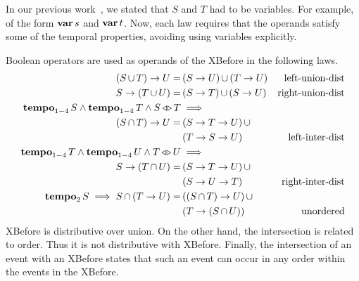 \documentclass[12pt,openright,twoside,a4paper,oldfontcommands,english,brazil,final]{abntex2}
\theoremstyle{theo}
\def\varop{\ensuremath\operatorname{\mathbf{var}}}
\newcommand{\var}[1]{\ensuremath\varop #1}
\def\xbeforeop{\ensuremath\rightarrow}
\newcommand{\xbefore}[2]{\ensuremath #1 \xbeforeop #2 }
\def\tempoop{\ensuremath\operatorname{\mathbf{tempo}}}
\newcommand{\tempo}[2][1-4]{\ensuremath\tempoop_{#1} #2}
\def\independenteventsop{\ensuremath\operatorname{\triangleleft\triangleright}}
\newcommand{\independentevents}[2]{\ensuremath #1 \independenteventsop #2}
\newcommand{\parsin}[1]{\ensuremath\left( #1 \right)}
\def\union{\ensuremath\operatorname{\cup}}
\def\inter{\ensuremath\operatorname{\cap}}
\begin{document}
In our previous work~\cite{DM2015}, we stated that $S$ and $T$ had to be variables.
For example, of the form $\var{s}$ and $\var{t}$.
Now, each law requires that the operands satisfy some of the temporal properties, avoiding using variables explicitly.

Boolean operators are used as operands of the \ac{XBefore} in the following laws.
%
\begin{subequations}
\begin{align}
\xbefore{\left(S \union T\right)}{U} =&
  \parsin{\xbefore{S}{U}} \union \parsin{\xbefore{T}{U}} &
  \text{left-union-dist}
  \label{thm:xbefore-sup-1}\\
%
\xbefore{S}{\left(T \union U\right)} =&
  \parsin{\xbefore{S}{T}} \union \parsin{\xbefore{S}{U}} &
  \text{right-union-dist}
  \label{thm:xbefore-sup-2}\\
%
\tempo{S} \land \tempo{T} \land \independentevents{S}{T} & \implies\nonumber \\
  \xbefore{\left(S \inter T\right)}{U} =&
  \parsin{\xbefore{\xbefore{S}{T}}{U}} \union \nonumber\\
  &\parsin{\xbefore{\xbefore{T}{S}}{U}} &
  \text{left-inter-dist}
  \label{thm:xbefore-inf-1}\\
%
\tempo{T} \land \tempo{U} \land \independentevents{T}{U} & \implies \nonumber\\
  \xbefore{S}{\left(T \inter U\right)} =&
  \parsin{\xbefore{S}{\xbefore{T}{U}}} \union \nonumber\\
  &\parsin{\xbefore{S}{\xbefore{U}{T}}} &
  \text{right-inter-dist}
  \label{thm:xbefore-inf-2}\\
%
\tempo[2]{S} \implies S \inter \parsin{\xbefore{T}{U}} =&
  \parsin{\xbefore{\parsin{S \inter T}}{U}} \union \nonumber\\
  &\parsin{\xbefore{T}{\parsin{S \inter U}}} &
  \text{unordered}
  \label{thm:and_xbefore_equiv_or_xbefore}
\end{align}
\end{subequations}
%
\ac{XBefore} is distributive over union.
On the other hand, the intersection is related to order.
Thus it is not distributive with \ac{XBefore}.
Finally, the intersection of an event with an \ac{XBefore} states that such an event can occur in any order within the events in the \ac{XBefore}.
\end{document}
